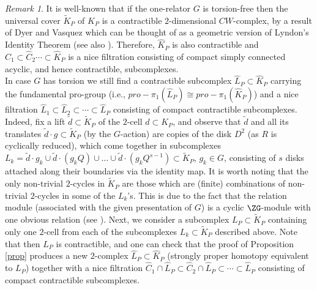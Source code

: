 \documentclass{amsart}[12pt]
\theoremstyle{definition}
\theoremstyle{remark}
\newtheorem{remark}[theorem]{Remark}
\numberwithin{equation}{section}
\begin{document}
\begin{remark} It is well-known that if the one-relator $G$ is torsion-free
then the universal cover $\tilde{K}_P$ of $K_P$ is a contractible
$2$-dimensional $CW$-complex, by a result of Dyer and Vasquez
\cite{DV} which can be thought of as a geometric version of
Lyndon's Identity Theorem \cite{L} (see also \cite{Cock}).
Therefore, $\widehat{K}_P$ is also contractible and $\widehat{C}_1
{\subset} \widehat{C}_2 \cdots {\subset} \widehat{K}_P$ is a nice filtration
consisting of compact simply connected acyclic, and hence contractible, subcomplexes.\\
\indent In case $G$ has torsion we still find a contractible
subcomplex $\widehat{L}_P {\subset} \widehat{K}_P$ carrying the
fundamental pro-group (i.e., $pro-\pi_1(\widehat{L}_P) \cong
pro-\pi_1(\widehat{K}_P)$) and a nice filtration $\widehat{L}_1
{\subset} \widehat{L}_2 {\subset} \cdots {\subset} \widehat{L}_P$ consisting of
compact contractible subcomplexes. Indeed, fix a lift $\tilde{d}
{\subset} \tilde{K}_P$ of the $2$-cell $d {\subset} K_P$, and observe that
$\tilde{d}$ and all its translates $\tilde{d} \cdot g {\subset}
\tilde{K}_P$ (by the $G$-action) are copies of the disk $D^2$ (as
$R$ is cyclically reduced), which come together in subcomplexes
$L_k= \tilde{d} \cdot g_k \cup \tilde{d} \cdot (g_k Q) \cup \dots
\cup \tilde{d} \cdot (g_k Q^{s-1}) {\subset} \tilde{K}_P$, $g_k \in G$,
consisting of $s$ disks attached along their boundaries via the
identity map. It is worth noting that the only non-trivial
$2$-cycles in $\tilde{K}_P$ are those which are (finite)
combinations of non-trivial $2$-cycles in some of the $L_k$'s.
This is due to the fact that the relation module (associated with
the given presentation of $G$) is a cyclic $\ZG$-module with one
obvious relation (see \cite{Chis, Brown}). Next, we consider a
subcomplex $L_P {\subset} \tilde{K}_P$ containing only one $2$-cell
from each of the subcomplexes $L_k {\subset} \tilde{K}_P$ described
above. Note that then $L_P$ is contractible, and one can check
that the proof of Proposition \ref{prop} produces a new
$2$-complex $\widehat{L}_P {\subset} \widehat{K}_P$ (strongly proper
homotopy equivalent to $L_P$) together with a nice filtration
$\widehat{C}_1 \cap \widehat{L}_P {\subset} \widehat{C}_2 \cap
\widehat{L}_P {\subset} \cdots {\subset} \widehat{L}_P$ consisting of
compact contractible subcomplexes.
\end{remark}
\end{document}
